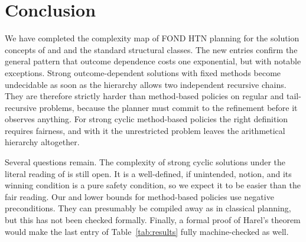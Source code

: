 \section{Conclusion}\label{sec:conclusion}

We have completed the complexity map of FOND HTN planning for the solution concepts of
\CBa{} and \CBb{} and the standard structural classes. The new entries confirm the general
pattern that outcome dependence costs one exponential, but with notable exceptions. Strong
outcome-dependent solutions with fixed methods become undecidable as soon as the hierarchy allows
two independent recursive chains. They are therefore strictly harder than method-based policies
on regular and tail-recursive problems, because the planner must commit to the refinement before
it observes anything. For strong cyclic method-based policies the right definition requires
fairness, and with it the unrestricted problem leaves the arithmetical hierarchy altogether.

Several questions remain. The complexity of strong cyclic solutions under the literal reading of
\CBb{} is still open. It is a well-defined, if unintended, notion, and its winning condition is a
pure safety condition, so we expect it to be easier than the fair reading. Our \EXPTIME{} and
\TWOEXP{} lower bounds for method-based policies use negative preconditions. They can presumably be
compiled away as in classical planning, but this has not been checked formally. Finally, a formal
proof of Harel's theorem would make the last entry of Table~\ref{tab:results} fully
machine-checked as well.
